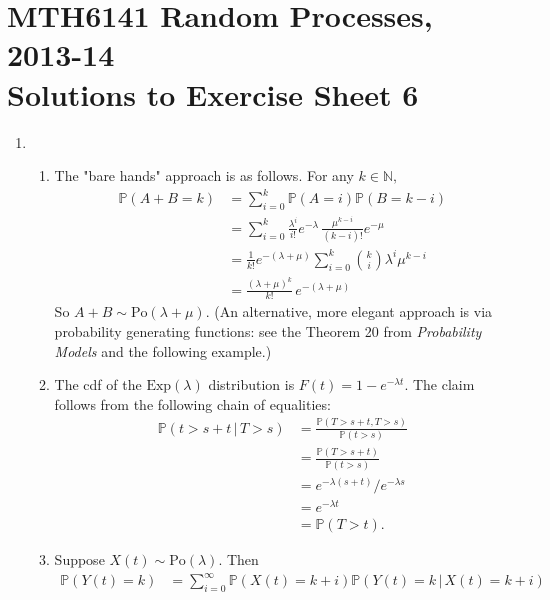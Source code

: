 \documentclass[11pt,a4paper]{article}
\begin{document}
    \section*{MTH6141 Random Processes, 2013-14\\Solutions to Exercise Sheet 6}
    \begin{enumerate}
        \item
        \begin{enumerate}
            \item  The "bare hands" approach is as follows. For any $k \in \mathbb{N,}$
            \begin{align*}
                \mathbb{P}(A+B = k)
                &= \sum_{i=0}^k \mathbb{P}(A = i)\mathbb{P}(B=k-i)\\
                &= \sum_{i=0}^k \frac{\lambda^i}{i!}e^{-\lambda}\, \frac{\mu^{k-i}}{(k-i)!}e^{-\mu}\\
                &= \frac{1}{k!}e^{-(\lambda + \mu)} \sum_{i=0}^k\binom{k}{i}\lambda^i\mu^{k-i}\\
                &= \frac{(\lambda + \mu)^k}{k!}\, e^{-(\lambda + \mu)}
            \end{align*}
            So $A+B \sim \text{Po}(\lambda + \mu)$. (An alternative, more elegant approach is via probability generating functions: see the Theorem 20 from \textit{Probability Models} and the following example.)
            \item The cdf of the $\text{Exp}(\lambda)$ distribution is $F(t) = 1-e^{-\lambda t}$. The claim follows from the following chain of equalities:
            \begin{align*}
                \mathbb{P}(t > s+t\, | \, T>s)
                &= \frac{\mathbb{P}(T>s+t,T>s)}{\mathbb{P}(t>s)}\\
                &= \frac{\mathbb{P}(T>s+t)}{\mathbb{P}(t>s)}\\
                &= e^{-\lambda(s+t)}/e^{-\lambda s}\\
                &= e^{-\lambda t}\\
                &= \mathbb{P}(T>t).
            \end{align*}
            \item Suppose $X(t) \sim \text{Po}(\lambda)$. Then
            \begingroup
            \allowdisplaybreaks
            \begin{align*}
                \mathbb{P}(Y(t) = k)
                &= \sum_{i=0}^\infty \mathbb{P}(X(t) = k+i)\mathbb{P}(Y(t) = k\, | \, X(t)=k+i)\\

\end{align*}
\end{enumerate}
\end{enumerate}
\end{document}
